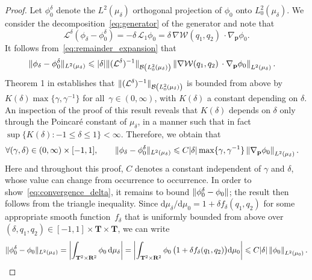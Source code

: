 \documentclass[11pt,a4paper]{article}
\newcommand{\real}{\mathbf R}
\newcommand{\torus}{\mathbf T}
\newcommand{\grad}{\nabla}
\newcommand{\vect}[1]{\boldsymbol{\mathbf #1}}
\renewcommand{\d}{\mathrm d}
\theoremstyle{plain}
\numberwithin{equation}{section}
\renewcommand{\leq}{\leqslant}
\begin{document}
\begin{proof}
    Let $\phi_0^{\delta}$ denote the $L^2(\mu_{\delta})$ orthogonal projection of $\phi_0$ onto $L^2_0(\mu_{\delta})$.
    We consider the decomposition~\eqref{eq:generator} of the generator and note that
    \begin{equation}
        \label{eq:remainder_expansion}
        \mathcal L^{\delta}(\phi_\delta - \phi_0^{\delta})
        = - \delta \, \mathcal L_1 \phi_0
        = \delta \, \grad \mathcal W(q_1, q_2) \, \cdot \grad_{\vect p} \phi_0.
    \end{equation}
    It follows from~\eqref{eq:remainder_expansion} that
     \begin{align*}
         \norm*{\phi_\delta - \phi_0^{\delta}}[L^2(\mu_{\delta})]
         &\leq \lvert \delta \rvert \norm*{(\mathcal L^{\delta})^{-1}} [\mathcal B\left(L^2_0(\mu_{\delta})\right)]
         \norm{\grad \mathcal W(q_1, q_2) \, \cdot \grad_{\vect p} \phi_0}[L^2(\mu_{\delta})].
     \end{align*}
     Theorem 1 in \cite{roussel2018spectral} establishes that $\norm*{(\mathcal L^{\delta})^{-1}}[\mathcal B \left( L^2_{0}(\mu_{\delta})\right)] $ is bounded from above by $K(\delta) \max\{\gamma, \gamma^{-1}\}$ for all~$\gamma \in (0, \infty)$,
     with $K(\delta)$ a constant depending on $\delta$.
     An inspection of the proof of this result reveals that $K(\delta)$ depends on $\delta$ only through the Poincaré constant of $\mu_{\delta}$,
     in a manner such that in fact $\sup \{K(\delta): -1 \leq \delta \leq 1\} < \infty$.
     Therefore, we obtain that
     \begin{align}
         \label{eq:convergence_l2}
         \forall (\gamma, \delta) \in (0, \infty) \times [-1, 1], \qquad
         \norm*{\phi_\delta - \phi_0^{\delta}}[L^2(\mu_{\delta})]
         &\leq C \lvert \delta \rvert \max\{\gamma, \gamma^{-1}\}
         \norm{\grad_{\vect p} \phi_0}[L^2(\mu_{\delta})].
     \end{align}
    Here and throughout this proof, $C$ denotes a constant independent of $\gamma$ and $\delta$,
    whose value can change from occurrence to occurrence.
    In order to show~\eqref{eq:convergence_delta},
    it remains to bound $\norm*{\phi_0^{\delta}- \phi_0}$;
    the result then follows from the triangle inequality.
    Since
    \(
        \d \mu_{\delta} / \d \mu_0  = 1 + \delta f_{\delta}(q_1, q_2)
    \)
    for some appropriate smooth function~$f_{\delta}$ that is uniformly bounded from above over $(\delta, q_1, q_2) \in [-1, 1] \times \torus \times \torus$,
    we can write
    \[
        \norm*{\phi_0^\delta - \phi_0} [L^2(\mu_\delta)]
        = \abs{ \int_{\torus^2 \times \real^2} \phi_0 \, \d \mu_{\delta} }
        = \abs{ \int_{\torus^2 \times \real^2} \phi_0 \,\bigl( 1 + \delta f_{\delta}(q_1, q_2) \bigr)\d \mu_{0}}
        \leq C \lvert \delta \rvert \norm{\phi_0}[L^2(\mu_0)].
    \]


\end{proof}
\end{document}
